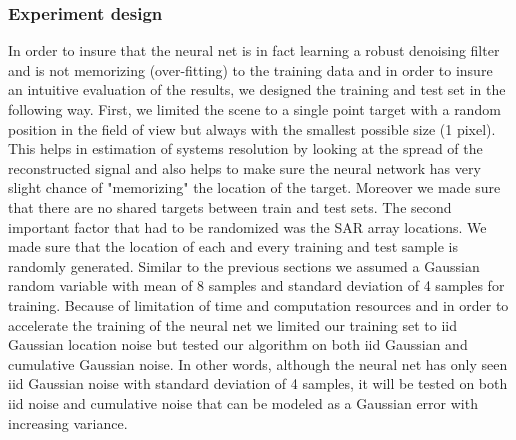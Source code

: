 \documentclass{article}
\begin{document}
\subsubsection{Experiment design}
In order to insure that the neural net is in fact learning a robust denoising filter and is not memorizing (over-fitting) to the training data and in order to insure an intuitive evaluation of the results, we designed the training and test set in the following way. First, we limited the scene to a single point target with a random position in the field of view but always with the smallest possible size (1 pixel). This helps in estimation of systems resolution by looking at the spread of the reconstructed signal and also helps to make sure the neural network has very slight chance of "memorizing" the location of the target. Moreover we made sure that there are no shared targets between train and test sets. The second important factor that had to be randomized was the SAR array locations. We made sure that the location of each and every training and test sample is randomly generated. Similar to the previous sections we assumed a Gaussian random variable with mean of 8 samples and standard deviation of 4 samples for training. Because of limitation of time and computation resources and in order to accelerate the training of the neural net we limited our training set to iid Gaussian location noise but tested our algorithm on both iid Gaussian and cumulative Gaussian noise. In other words, although the neural net has only seen iid Gaussian noise with standard deviation of 4 samples, it will be tested on both iid noise and cumulative noise that can be modeled as a Gaussian error with increasing variance. 
\end{document}
